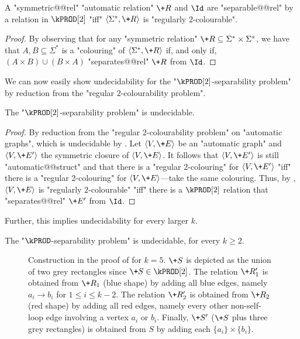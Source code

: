 \begin{corollary}\AP\label{cor:2reg-2prod}
    A "symmetric@@rel" "automatic relation" $\+R$ and $\Id$ are "separable@@rel" by a relation in $\kPROD[2]$ "iff" $\tup{\Sigma^*,\+R}$ is "regularly $2$-colourable".
\end{corollary}

\begin{proof}
    By observing that for any "symmetric relation" $\+R \subseteq \Sigma^* \times \Sigma^*$, we have that $A,B \subseteq \Sigma^*$ is a "colouring" of $\tup{\Sigma^*,\+R}$ if, and only if, $(A \times B) \cup (B \times A)$ "separates@@rel" $\+R$ from $\Id$.
\end{proof}

We can now easily show undecidability for the "$\kPROD[2]$-separability problem" by reduction from the "regular $2$-colourability problem".
\begin{lemma}\AP\label{lem:aut-2prod-sep-undec}
    The "$\kPROD[2]$-separability problem" is undecidable.
\end{lemma}
\begin{proof}
    By reduction from the "regular $2$-colourability problem" on "automatic graphs", which is undecidable by . Let $\tup{V,\+E}$ be an "automatic graph" and $\tup{V,\+E'}$ the symmetric closure of $\tup{V,\+E}$. It follows that $\tup{V,\+E'}$ is still "automatic@@struct" and that there is a "regular $2$-colouring" for $\tup{V,\+E'}$ "iff" there is a "regular $2$-colouring" for $\tup{V,\+E}$---take the same colouring.
    Thus, by , $\tup{V,\+E}$ is "regularly $2$-colourable" "iff" 
    there is a $\kPROD[2]$ relation that "separates@@rel" $\+E'$ from $\Id$.
\end{proof}

Further, this implies undecidability for every larger $k$.
\begin{proposition}
    \AP\label{prop:kprod-undecidable}
    The "$\kPROD$-separability problem" is undecidable, for every $k \geq 2$.
\end{proposition}

\begin{figure}
    \centering
    \begin{tikzpicture}
        
    \end{tikzpicture}
    \caption{
        \AP\label{fig:2prod-to-kprod}
        Construction in the proof of  for $k = 5$. $\+S$ is depicted as the union of two grey rectangles since $\+S \in \kPROD[2]$.
        The relation $\+R'_1$ is obtained from $\+R_1$ (blue shape) by adding all blue edges,
        namely $a_i \to b_i$ for $1\leq i \leq k-2$. The relation $\+R'_2$ is obtained from $\+R_2$ (red shape) by adding
        all red edges, namely every other non-self-loop edge involving a vertex $a_i$ or $b_i$.
        Finally, $\+S'$ ($\+S$ plus three grey rectangles) is obtained from $S$ by adding
        each $\{a_i\} \times \{b_i\}$.
    }
\end{figure}

